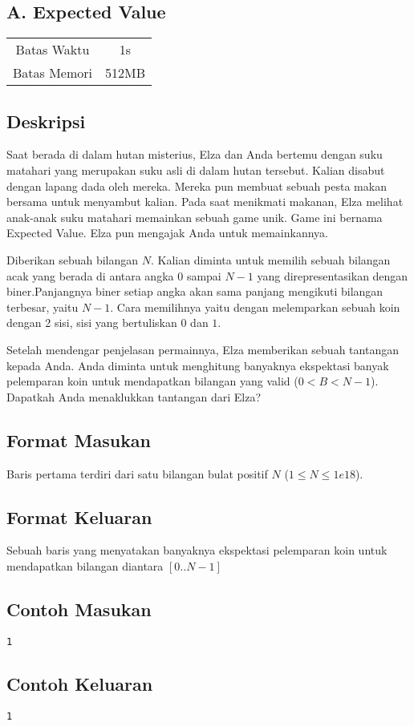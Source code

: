 \documentclass{article}
\begin{document}
\begin{center}
    \section*{A. Expected Value} %

    \begin{tabular}{ | c c | }
        \hline
        Batas Waktu  & 1s \\    %
        Batas Memori & 512MB \\  %
        \hline
    \end{tabular}
\end{center}

\subsection*{Deskripsi}
Saat berada di dalam hutan misterius, Elza dan Anda bertemu dengan suku matahari yang merupakan suku asli di dalam hutan tersebut.
Kalian disabut dengan lapang dada oleh mereka. Mereka pun membuat sebuah pesta makan bersama untuk menyambut kalian.
Pada saat menikmati makanan, Elza melihat anak-anak suku matahari memainkan sebuah game unik. Game ini bernama Expected Value. Elza pun
mengajak Anda untuk memainkannya.

Diberikan sebuah bilangan $N$. Kalian diminta untuk memilih sebuah bilangan acak yang berada di antara angka $0$ sampai $N-1$ yang 
direpresentasikan dengan biner.Panjangnya biner setiap angka akan sama panjang mengikuti bilangan terbesar, yaitu $N-1$.
Cara memilihnya yaitu dengan melemparkan sebuah koin dengan 2 sisi, sisi yang bertuliskan $0$ dan $1$.

Setelah mendengar penjelasan permainnya, Elza memberikan sebuah tantangan kepada Anda. Anda diminta untuk menghitung banyaknya 
ekspektasi banyak pelemparan koin untuk mendapatkan bilangan yang valid ($0 < B < N-1$). Dapatkah Anda menaklukkan tantangan dari Elza?

\subsection*{Format Masukan}
Baris pertama terdiri dari satu bilangan bulat positif $N$ ($1 \leq N \leq 1e18$).

\subsection*{Format Keluaran}
Sebuah baris yang menyatakan banyaknya ekspektasi pelemparan koin untuk mendapatkan bilangan diantara $[0..N-1]$
\\

\begin{multicols}{2}
\subsection*{Contoh Masukan}
\begin{lstlisting}
1
\end{lstlisting}
\columnbreak
\subsection*{Contoh Keluaran}
\begin{lstlisting}
1
\end{lstlisting}
\vfill
\null
\end{multicols}


\pagebreak
\end{document}
